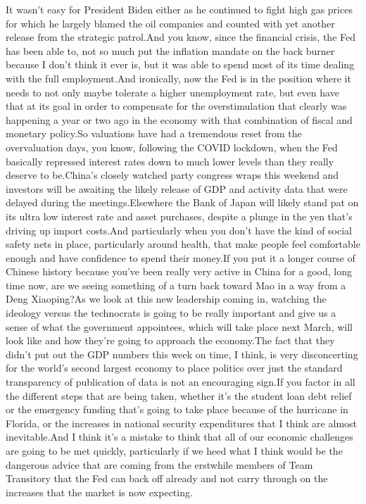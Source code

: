 \documentclass{article}%
\begin{document}
It wasn't easy for President Biden either as he continued to fight high gas prices for which he largely blamed the oil companies and counted with yet another release from the strategic patrol.And you know, since the financial crisis, the Fed has been able to, not so much put the inflation mandate on the back burner because I don't think it ever is, but it was able to spend most of its time dealing with the full employment.And ironically, now the Fed is in the position where it needs to not only maybe tolerate a higher unemployment rate, but even have that at its goal in order to compensate for the overstimulation that clearly was happening a year or two ago in the economy with that combination of fiscal and monetary policy.So valuations have had a tremendous reset from the overvaluation days, you know, following the COVID lockdown, when the Fed basically repressed interest rates down to much lower levels than they really deserve to be.China's closely watched party congress wraps this weekend and investors will be awaiting the likely release of GDP and activity data that were delayed during the meetings.Elsewhere the Bank of Japan will likely stand pat on its ultra low interest rate and asset purchases, despite a plunge in the yen that's driving up import costs.And particularly when you don't have the kind of social safety nets in place, particularly around health, that make people feel comfortable enough and have confidence to spend their money.If you put it a longer course of Chinese history because you've been really very active in China for a good, long time now, are we seeing something of a turn back toward Mao in a way from a Deng Xiaoping?As we look at this new leadership coming in, watching the ideology versus the technocrats is going to be really important and give us a sense of what the government appointees, which will take place next March, will look like and how they're going to approach the economy.The fact that they didn't put out the GDP numbers this week on time, I think, is very disconcerting for the world's second largest economy to place politics over just the standard transparency of publication of data is not an encouraging sign.If you factor in all the different steps that are being taken, whether it's the student loan debt relief or the emergency funding that's going to take place because of the hurricane in Florida, or the increases in national security expenditures that I think are almost inevitable.And I think it's a mistake to think that all of our economic challenges are going to be met quickly, particularly if we heed what I think would be the dangerous advice that are coming from the erstwhile members of Team Transitory that the Fed can back off already and not carry through on the increases that the market is now expecting.%
\end{document}
